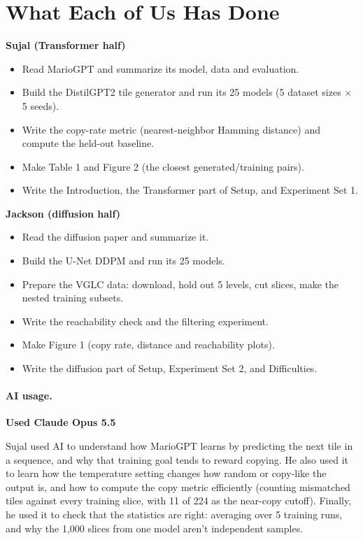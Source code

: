 \documentclass[11pt]{alt2027}
\begin{document}
\section{What Each of Us Has Done}
\textbf{Sujal (Transformer half)}
\begin{itemize}\setlength{\itemsep}{0pt}\setlength{\parsep}{0pt}\setlength{\topsep}{3pt}\setlength{\leftmargini}{12pt}
\item Read MarioGPT and summarize its model, data and evaluation.
\item Build the DistilGPT2 tile generator and run its 25 models (5 dataset sizes $\times$ 5 seeds).
\item Write the copy-rate metric (nearest-neighbor Hamming distance) and compute the held-out baseline.
\item Make Table 1 and Figure 2 (the closest generated/training pairs).
\item Write the Introduction, the Transformer part of Setup, and Experiment Set 1.
\end{itemize}

\textbf{Jackson (diffusion half)}
\begin{itemize}\setlength{\itemsep}{0pt}\setlength{\parsep}{0pt}\setlength{\topsep}{3pt}\setlength{\leftmargini}{12pt}
\item Read the diffusion paper and summarize it.
\item Build the U-Net DDPM and run its 25 models.
\item Prepare the VGLC data: download, hold out 5 levels, cut slices, make the nested training subsets.
\item Write the reachability check and the filtering experiment.
\item Make Figure 1 (copy rate, distance and reachability plots).
\item Write the diffusion part of Setup, Experiment Set 2, and Difficulties.
\end{itemize}

\paragraph{AI usage.}
\textbf{Used Claude Opus 5.5}

Sujal used AI to understand how MarioGPT learns by predicting the next tile in a sequence, and why that training goal tends to reward copying. He also used it to learn how the temperature setting changes how random or copy-like the output is, and how to compute the copy metric efficiently (counting mismatched tiles against every training slice, with 11 of 224 as the near-copy cutoff). Finally, he used it to check that the statistics are right: averaging over 5 training runs, and why the 1,000 slices from one model aren't independent samples.
\end{document}

